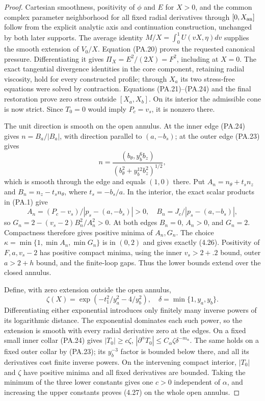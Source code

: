 \documentclass[10pt,a4paper]{article}
\begin{document}
\begin{proof}
Cartesian smoothness, positivity of $\phi$ and $E$ for $X>0$, and the common
complex parameter neighborhood for all fixed radial derivatives through
$[0,X_{\rm an}]$ follow from the explicit analytic axis and continuation
construction, unchanged by both later supports. The average identity
$M/X=\int_0^1U(vX,\eta)dv$ supplies the smooth extension of $V_0/X$.
Equation (PA.20) proves the requested canonical pressure. Differentiating it gives
$\Pi_X=E^2/(2X)=F^2$, including at $X=0$. The exact tangential divergence
identities in the core component, retaining radial viscosity, hold for every
constructed profile; through $X_a$ its two stress-free equations were solved
by contraction. Equations (PA.21)--(PA.24) and the final restoration prove zero
stress outside $[X_a,X_b]$. On its interior the admissible cone is now strict.
Since $T_0=0$ would imply $P_c=v_s$, it is nonzero there.

The unit direction is smooth on the open annulus. At the inner edge (PA.24) gives
$n=B_a/|B_a|$, with direction parallel to $(a,-b_s)$; at the outer edge (PA.23)
gives
\[
 n=\frac{(b_\theta,y_b^6b_z)}{(b_\theta^2+y_b^{12}b_z^2)^{1/2}},
\]
which is smooth through the edge and equals $(1,0)$ there. Put
$A_n=n_\theta+t_sn_z$ and $B_n=n_z-t_sn_\theta$, where $t_s=-b_s/a$.
In the interior, the exact scalar products in (PA.1) give
\[
 A_n=(P_c-v_s)/|p_s-(a,-b_s)|>0,\quad
 B_n=J_c/|p_s-(a,-b_s)|,
\]
so $G_n=2-(v_s-2)B_n^2/A_n^2>0$. At both edges $B_n=0$, $A_n>0$,
and $G_n=2$. Compactness therefore gives positive minima of $A_n,G_n$.
The choice $\kappa=\min\{1,\min A_n,\min G_n\}$ is in $(0,2)$ and
gives exactly (4.26). Positivity of $F,a,v_s-2$ has positive compact minima,
using the inner $v_s>2+.2$ bound, outer $a>2+h$ bound, and the finite-loop
gaps. Thus the lower bounds extend over the closed annulus.

Define, with zero extension outside the open annulus,
\[
 \zeta(X)=\exp(-t_1^2/y_a^2-4/y_b^2),\quad
 \delta=\min\{1,y_a,y_b\}.
\]
Differentiating either exponential introduces only finitely many inverse
powers of its logarithmic distance. The exponential dominates each such
power, so the extension is smooth with every radial derivative zero at the
edges. On a fixed small inner collar (PA.24) gives
$|T_0|\ge c\zeta$, $|\partial^\alpha T_0|\le C_\alpha\zeta\delta^{-m_\alpha}$.
The same holds on a fixed outer collar by (PA.23); its $y_b^{-3}$ factor is
bounded below there, and all its derivatives cost finite inverse powers.
On the intervening compact interior, $|T_0|$ and $\zeta$ have positive
minima and all fixed derivatives are bounded. Taking the minimum of the
three lower constants gives one $c>0$ independent of $\alpha$, and increasing
the upper constants proves (4.27) on the whole open annulus.


\end{proof}
\end{document}
